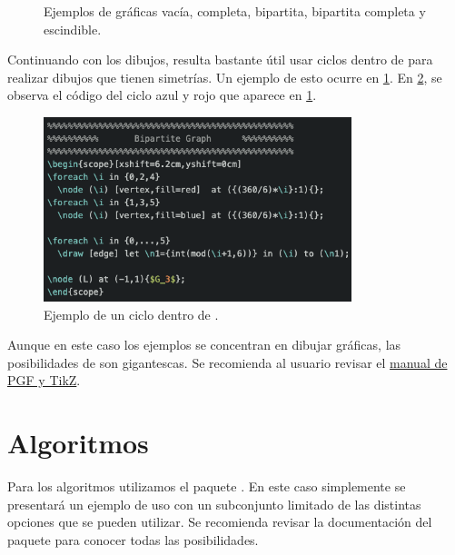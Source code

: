 \begin{figure}[ht!]
\caption{Ejemplos de gr\'aficas vac\'ia, completa,
bipartita, bipartita completa y escindible.}
\label{fig:fam1}
\end{figure}

Continuando con los dibujos, resulta bastante \'util usar ciclos 
dentro de  para realizar dibujos que tienen simetr\'ias.   Un ejemplo
de esto ocurre en \cref{fig:fam1}.   En \cref{fig:tikzFor}, se observa el
c\'odigo del ciclo azul y rojo que aparece en \cref{fig:fam1}.

\begin{figure}[ht!]
  \centering
  \includegraphics[width=0.8\textwidth]{recursos/capturas/tikzfor}
  \caption{Ejemplo de un ciclo  dentro de .}
  \label{fig:tikzFor}
\end{figure}

Aunque en este caso los ejemplos se concentran en dibujar gr\'aficas, las
posibilidades de  son gigantescas.   Se recomienda al usuario revisar
el \href{https://mirror.las.iastate.edu/tex-archive/graphics/pgf/base/doc/%
pgfmanual.pdf}{manual de PGF y TikZ}.


\section{Algoritmos}

Para los algoritmos utilizamos el paquete \href{https://www.ctan.org/pkg/%
algorithm2e}{}.   En este caso simplemente
se presentar\'a un ejemplo de uso con un subconjunto limitado de las distintas
opciones que se pueden utilizar.   Se recomienda revisar la documentaci\'on del
paquete para conocer todas las posibilidades.

